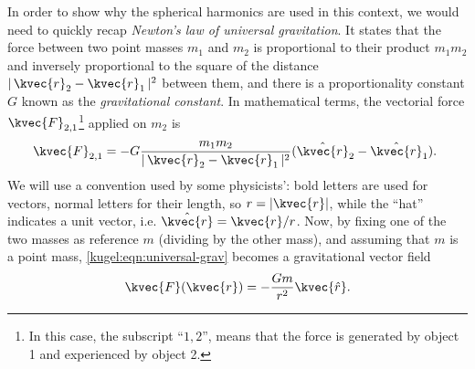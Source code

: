 In order to show why the spherical harmonics are used in this context, we would
need to quickly recap \emph{Newton's law of universal gravitation}. It states
that the force between two point masses $m_1$ and $m_2$ is proportional to their
product $m_1 m_2$ and inversely proportional to the square of the distance
$|\,\kvec{r}_2-\kvec{r}_1 \,|^2$ between them, and there is a proportionality
constant $G$ known as the \emph{gravitational constant}. In mathematical terms,
the vectorial force $\kvec{F}_{2,1}$\footnote{In this case, the subscript
``$1,2$'',  means that the force is generated by object 1 and experienced by
object 2.} applied on $m_2$ is
\begin{equation}
  \kvec{F}_{2,1} = -G\frac{m_1m_2}{|\, \kvec{r}_2 - \kvec{r}_1 \,|^2}
    ( \hat{\kvec{r}}_2-\hat{\kvec{r}}_1 ).\
    \label{kugel:eqn:universal-grav}
\end{equation}
We will use a convention used by some physicists': bold letters are used for
vectors, normal letters for their length, so $r = |\kvec{r}|$, while the ``hat''
indicates a unit vector, i.e. $ \hat{\kvec{r}} = \kvec{r}/r$.  Now, by fixing
one of the two masses as reference $m$ (dividing by the other mass), and
assuming that $m$ is a point mass, \eqref{kugel:eqn:universal-grav} becomes a
gravitational vector field
\begin{equation}
  \label{kugel:eqn:grav-vec-field}
  \kvec{F}(\kvec{r}) = -\frac{Gm}{r^2}\kvec{\hat{r}}.
\end{equation}

